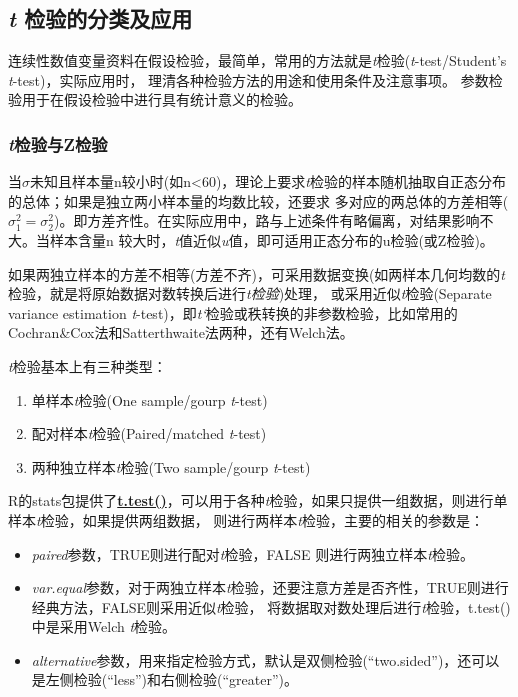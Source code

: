 \documentclass[
]{article}
\providecommand{\tightlist}{%
  \setlength{\itemsep}{0pt}\setlength{\parskip}{0pt}}
\begin{document}
\hypertarget{t-ux68c0ux9a8cux7684ux5206ux7c7bux53caux5e94ux7528}{%
\subsection{\texorpdfstring{\emph{t} 检验的分类及应用}{t 检验的分类及应用}}\label{t-ux68c0ux9a8cux7684ux5206ux7c7bux53caux5e94ux7528}}

连续性数值变量资料在假设检验，最简单，常用的方法就是\emph{t}检验(\emph{t}-test/Student's \emph{t}-test)，实际应用时，
理清各种检验方法的用途和使用条件及注意事项。
参数检验用于在假设检验中进行具有统计意义的检验。

\hypertarget{tux68c0ux9a8cux4e0ezux68c0ux9a8c}{%
\subsubsection{\texorpdfstring{\emph{t}检验与Z检验}{t检验与Z检验}}\label{tux68c0ux9a8cux4e0ezux68c0ux9a8c}}

当\(\sigma\)未知且样本量n较小时(如n\textless60)，理论上要求\emph{t}检验的样本随机抽取自正态分布的总体；如果是独立两小样本量的均数比较，还要求
多对应的两总体的方差相等(\(\sigma_1^2=\sigma_2^2\))。即方差齐性。在实际应用中，路与上述条件有略偏离，对结果影响不大。当样本含量n
较大时，\emph{t}值近似\emph{u}值，即可适用正态分布的u检验(或Z检验)。

如果两独立样本的方差不相等(方差不齐)，可采用数据变换(如两样本几何均数的\emph{t}检验，就是将原始数据对数转换后进行\emph{t检验})处理，
或采用近似\emph{t}检验(Separate variance estimation \emph{t}-test)，即\emph{t`}检验或秩转换的非参数检验，比如常用的Cochran\&Cox法和Satterthwaite法两种，还有Welch法。

\emph{t}检验基本上有三种类型：

\begin{enumerate}
\def\labelenumi{\arabic{enumi}.}
\item
  单样本\emph{t}检验(One sample/gourp \emph{t}-test)
\item
  配对样本\emph{t}检验(Paired/matched \emph{t}-test)
\item
  两种独立样本\emph{t}检验(Two sample/gourp \emph{t}-test)
\end{enumerate}

R的stats包提供了\href{https://www.rdocumentation.org/packages/stats/versions/3.6.2/topics/t.test}{\textbf{t.test()}}，可以用于各种\emph{t}检验，如果只提供一组数据，则进行单样本\emph{t}检验，如果提供两组数据，
则进行两样本\emph{t}检验，主要的相关的参数是：

\begin{itemize}
\tightlist
\item
  \emph{paired}参数，TRUE则进行配对\emph{t}检验，FALSE 则进行两独立样本\emph{t}检验。
\item
  \emph{var.equal}参数，对于两独立样本\emph{t}检验，还要注意方差是否齐性，TRUE则进行经典方法，FALSE则采用近似\emph{t}检验，
  将数据取对数处理后进行\emph{t}检验，t.test()中是采用Welch \emph{t}检验。
\item
  \emph{alternative}参数，用来指定检验方式，默认是双侧检验(``two.sided'')，还可以是左侧检验(``less'')和右侧检验(``greater'')。
\end{itemize}
\end{document}
